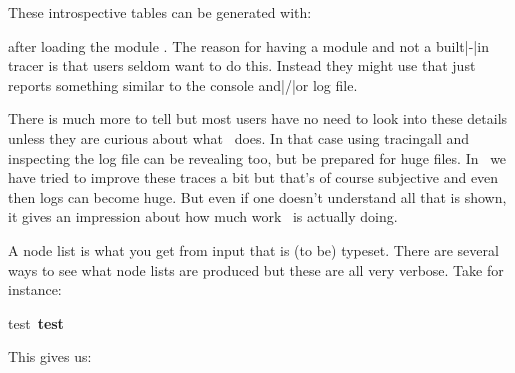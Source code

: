 These introspective tables can be generated with:

\starttyping
\luatokentable\test
\stoptyping

after loading the module . The reason for having a module
and not a built|-|in tracer is that users seldom want to do this. Instead they
might use \typ {\showluatokens \test} that just reports something similar to the
console and|/|or log file.

There is much more to tell but most users have no need to look into these
details unless they are curious about what \TEX\ does. In that case using \type
{tracingall} and inspecting the log file can be revealing too, but be prepared
for huge files. In \LUAMETATEX\ we have tried to improve these traces a bit but
that's of course subjective and even then logs can become huge. But even if one
doesn't understand all that is shown, it gives an impression about how much work
\TEX\ is actually doing.

\stopsectionlevel

\startsectionlevel[title=Node lists]

A node list is what you get from input that is (to be) typeset. There are several
ways to see what node lists are produced but these are all very verbose. Take for
instance:

\startbuffer
\setbox\scratchbox\hbox{test \bf test}

\showboxhere\scratchbox
\stopbuffer

\typebuffer

This gives us:

